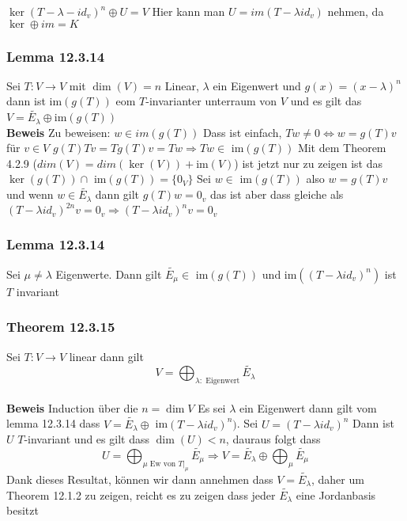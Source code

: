 \documentclass{article}
\newcommand{\beweis}{\\\textbf{Beweis }}
\newcommand{\theorem}[1]{\subsubsection*{Theorem {#1}}}
\newcommand{\lemma}[1]{\subsubsection*{Lemma {#1}}}
\begin{document}
$\ker(T-\lambda -id_v)^n \oplus U =V$ Hier kann man $U=im(T-\lambda id_v)$ nehmen, da $\ker \oplus im = K$
\lemma{12.3.14} Sei $T:V\rightarrow V$ mit $\dim(V)=n$ Linear, $\lambda$ ein Eigenwert und $g(x)=(x-\lambda)^n$ dann ist im$(g(T))$ eom $T$-invarianter unterraum von $V$ und es gilt das $V= \tilde{E_\lambda}\oplus \text{im}(g(T))$
\beweis Zu beweisen: $w\in im(g(T))$ Dass ist einfach, $Tw\neq 0\Leftrightarrow w=g(T)v$ für $v\in V$ $g(T)Tv=Tg(T)v=Tw\Rightarrow Tw\in$ im$(g(T))$
Mit dem Theorem 4.2.9 ($dim(V)=dim(\ker(V))+$im$(V)$) ist jetzt nur zu zeigen ist das $\ker(g(T))\cap$ im$(g(T)) =\lbrace 0_V\rbrace$ Sei $w\in$ im$(g(T))$ also $w=g(T)v$ und wenn $w\in \tilde{E_\lambda}$ dann gilt
$g(T)w=0_v$ das ist aber dass gleiche als $(T-\lambda id_v)^{2n}v=0_v\Rightarrow (T-\lambda id_v)^n v=0_v$
\lemma{12.3.14} Sei $\mu\neq\lambda$ Eigenwerte. Dann gilt $\tilde{E_\mu}\in$  im$(g(T))$ und im$((T-\lambda id_v)^n)$ ist $T$ invariant
\theorem{12.3.15} Sei $T:V\rightarrow V$ linear dann gilt \[V=\bigoplus_{\lambda: \text{ Eigenwert}} \tilde{E_\lambda}\]
\beweis Induction über die $n=\dim V$ Es sei $\lambda$ ein Eigenwert dann gilt vom lemma 12.3.14 dass $V=\tilde{E_\lambda}\oplus$ im$(T-\lambda id_v)^n)$. Sei $U=(T-\lambda id_v)^n$ Dann ist $U$ $T$-invariant und es gilt dass $\dim(U)<n$, dauraus folgt dass \[U =\bigoplus_{\mu\text{ Ew von } T|_{\mu}}\tilde{E_\mu}\Rightarrow V=\tilde{E_\lambda}\oplus\bigoplus_{\mu}\tilde{E_\mu}\] 
Dank dieses Resultat, können wir dann annehmen dass $V=\tilde{E_\lambda}$, daher um Theorem 12.1.2 zu zeigen, reicht es zu zeigen dass jeder $\tilde{E_\lambda}$ eine Jordanbasis besitzt
\end{document}
